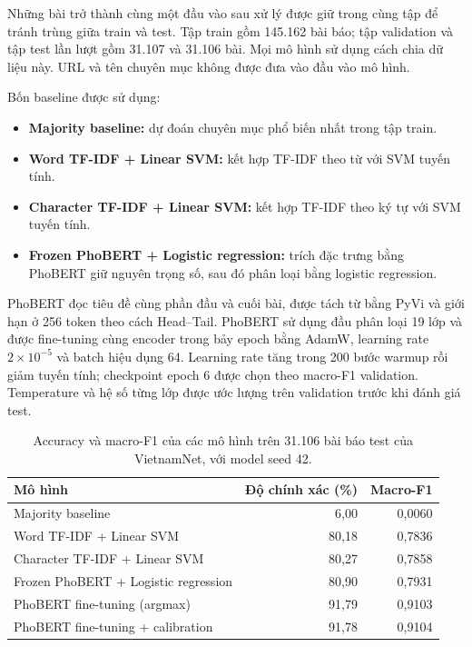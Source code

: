\documentclass[12pt,a4paper]{report}
\begin{document}
Những bài trở thành cùng một đầu vào sau xử lý được giữ trong cùng tập để tránh trùng giữa train và test. Tập train gồm 145.162 bài báo; tập validation và tập test lần lượt gồm 31.107 và 31.106 bài. Mọi mô hình sử dụng cách chia dữ liệu này. URL và tên chuyên mục không được đưa vào đầu vào mô hình.

Bốn baseline được sử dụng:
\begin{itemize}
\item \textbf{Majority baseline:} dự đoán chuyên mục phổ biến nhất trong tập train.
\item \textbf{Word TF-IDF + Linear SVM:} kết hợp TF-IDF theo từ với SVM tuyến tính.
\item \textbf{Character TF-IDF + Linear SVM:} kết hợp TF-IDF theo ký tự với SVM tuyến tính.
\item \textbf{Frozen PhoBERT + Logistic regression:} trích đặc trưng bằng PhoBERT giữ nguyên trọng số, sau đó phân loại bằng logistic regression.
\end{itemize}

PhoBERT đọc tiêu đề cùng phần đầu và cuối bài, được tách từ bằng PyVi và giới hạn ở 256 token theo cách Head--Tail. PhoBERT sử dụng đầu phân loại 19 lớp và được fine-tuning cùng encoder trong bảy epoch bằng AdamW, learning rate $2\times10^{-5}$ và batch hiệu dụng 64. Learning rate tăng trong 200 bước warmup rồi giảm tuyến tính; checkpoint epoch 6 được chọn theo macro-F1 validation. Temperature và hệ số từng lớp được ước lượng trên validation trước khi đánh giá test.

\begin{table}[htbp]\centering
\begin{tabularx}{\linewidth}{@{}Xrr@{}}\toprule
Mô hình & Độ chính xác (\%) & Macro-F1\\\midrule
Majority baseline & 6,00 & 0,0060\\
Word TF-IDF + Linear SVM & 80,18 & 0,7836\\
Character TF-IDF + Linear SVM & 80,27 & 0,7858\\
Frozen PhoBERT + Logistic regression & 80,90 & 0,7931\\
PhoBERT fine-tuning (argmax) & 91,79 & 0,9103\\
PhoBERT fine-tuning + calibration & 91,78 & 0,9104\\\bottomrule
\end{tabularx}
\caption{Accuracy và macro-F1 của các mô hình trên 31.106 bài báo test của VietnamNet, với model seed 42.}
\end{table}
\end{document}
